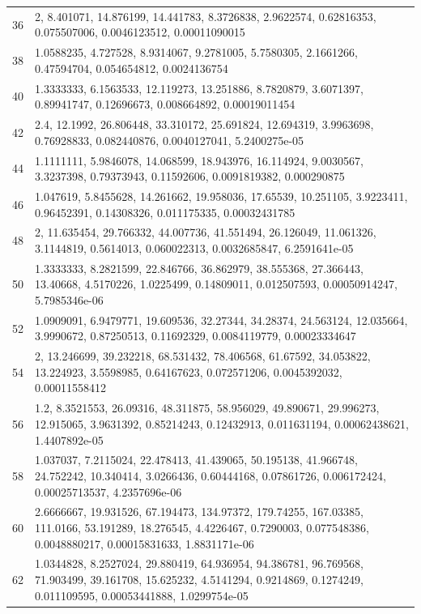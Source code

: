 \documentclass[11pt]{article}
\theoremstyle{definition}
\theoremstyle{remark}
\begin{document}
{\begin{longtable}{r p{}}
36 & 2, 8.401071, 14.876199, 14.441783, 8.3726838, 2.9622574, 0.62816353, 0.075507006, 0.0046123512, 0.00011090015 \\
38 & 1.0588235, 4.727528, 8.9314067, 9.2781005, 5.7580305, 2.1661266, 0.47594704, 0.054654812, 0.0024136754 \\
40 & 1.3333333, 6.1563533, 12.119273, 13.251886, 8.7820879, 3.6071397, 0.89941747, 0.12696673, 0.008664892, 0.00019011454 \\
42 & 2.4, 12.1992, 26.806448, 33.310172, 25.691824, 12.694319, 3.9963698, 0.76928833, 0.082440876, 0.0040127041, 5.2400275e-05 \\
44 & 1.1111111, 5.9846078, 14.068599, 18.943976, 16.114924, 9.0030567, 3.3237398, 0.79373943, 0.11592606, 0.0091819382, 0.000290875 \\
46 & 1.047619, 5.8455628, 14.261662, 19.958036, 17.65539, 10.251105, 3.9223411, 0.96452391, 0.14308326, 0.011175335, 0.00032431785 \\
48 & 2, 11.635454, 29.766332, 44.007736, 41.551494, 26.126049, 11.061326, 3.1144819, 0.5614013, 0.060022313, 0.0032685847, 6.2591641e-05 \\
50 & 1.3333333, 8.2821599, 22.846766, 36.862979, 38.555368, 27.366443, 13.40668, 4.5170226, 1.0225499, 0.14809011, 0.012507593, 0.00050914247, 5.7985346e-06 \\
52 & 1.0909091, 6.9479771, 19.609536, 32.27344, 34.28374, 24.563124, 12.035664, 3.9990672, 0.87250513, 0.11692329, 0.0084119779, 0.00023334647 \\
54 & 2, 13.246699, 39.232218, 68.531432, 78.406568, 61.67592, 34.053822, 13.224923, 3.5598985, 0.64167623, 0.072571206, 0.0045392032, 0.00011558412 \\
56 & 1.2, 8.3521553, 26.09316, 48.311875, 58.956029, 49.890671, 29.996273, 12.915065, 3.9631392, 0.85214243, 0.12432913, 0.011631194, 0.00062438621, 1.4407892e-05 \\
58 & 1.037037, 7.2115024, 22.478413, 41.439065, 50.195138, 41.966748, 24.752242, 10.340414, 3.0266436, 0.60444168, 0.07861726, 0.006172424, 0.00025713537, 4.2357696e-06 \\
60 & 2.6666667, 19.931526, 67.194473, 134.97372, 179.74255, 167.03385, 111.0166, 53.191289, 18.276545, 4.4226467, 0.7290003, 0.077548386, 0.0048880217, 0.00015831633, 1.8831171e-06 \\
62 & 1.0344828, 8.2527024, 29.880419, 64.936954, 94.386781, 96.769568, 71.903499, 39.161708, 15.625232, 4.5141294, 0.9214869, 0.1274249, 0.011109595, 0.00053441888, 1.0299754e-05 \\

\end{longtable}}
\end{document}

